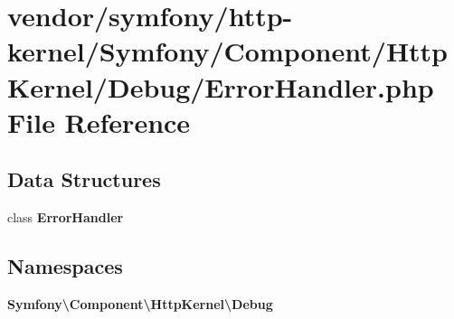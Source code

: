 \section{vendor/symfony/http-\/kernel/\+Symfony/\+Component/\+Http\+Kernel/\+Debug/\+Error\+Handler.php File Reference}
\label{symfony_2http-kernel_2_symfony_2_component_2_http_kernel_2_debug_2_error_handler_8php}
\subsection*{Data Structures}
\begin{DoxyCompactItemize}
\item 
class {\bf Error\+Handler}
\end{DoxyCompactItemize}
\subsection*{Namespaces}
\begin{DoxyCompactItemize}
\item 
 {\bf Symfony\textbackslash{}\+Component\textbackslash{}\+Http\+Kernel\textbackslash{}\+Debug}
\end{DoxyCompactItemize}
